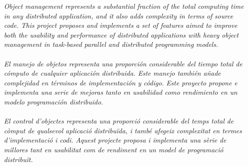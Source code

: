 \textit{Object management represents a substantial fraction of the total computing time in any distributed application, and it also adds complexity in terms of source code. This project proposes and implements a set of features aimed to improve both the usability and performance of distributed applications with heavy object management in task-based parallel and distributed programming models.}\\
\\
\textit{El manejo de objetos representa una proporción considerable del tiempo total de cómputo de cualquier aplicación distribuida. Este manejo también añade complejidad en términos de implementación y código. Este proyecto propone e implementa una serie de mejoras tanto en usabilidad como rendimiento en un modelo programación distribuido.}\\
\\
\textit{El control d'objectes representa una proporció considerable del temps total de còmput de qualsevol aplicació distribuïda, i també afegeix complexitat en termes d'implementació i codi. Aquest projecte proposa i implementa una sèrie de millores tant en usabilitat com de rendiment en un model de programació distribuït.}